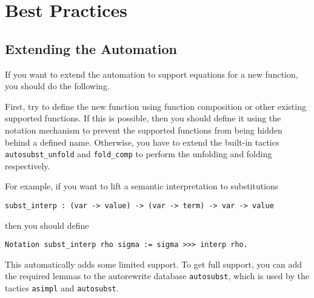 \documentclass{scrartcl}
\newcommand{\lst}{\lstinline}
\begin{document}
\section{Best Practices}
\label{sec:best-practices}



\subsection{Extending the Automation}
\label{sec:ext-auto}

If you want to extend the automation to support equations for a new function, you should do the following.

First, try to define the new function using function composition or other existing supported functions.
If this is possible, then you should define it using the notation mechanism to prevent the supported functions from being hidden behind a defined name. Otherwise, you have to extend the built-in tactics \lst$autosubst_unfold$ and \lst$fold_comp$ to perform the unfolding and folding respectively.

For example, if you want to lift a semantic interpretation to substitutions 
\begin{lstlisting}
subst_interp : (var -> value) -> (var -> term) -> var -> value  
\end{lstlisting}
then you should define
\begin{lstlisting}
Notation subst_interp rho sigma := sigma >>> interp rho.
\end{lstlisting}
This automatically adds some limited support. To get full support, you can add the required lemmas to the autorewrite database \lst$autosubst$, which is used by the tactics \lst$asimpl$ and \lst$autosubst$.



\end{document}
